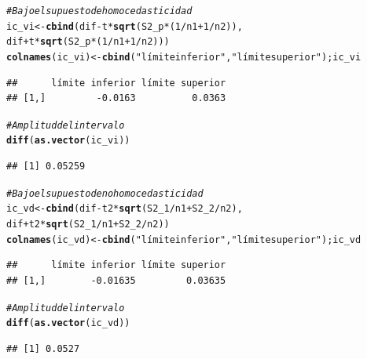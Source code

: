 \documentclass[a4paper]{scrartcl}\usepackage[]{graphicx}\usepackage[]{color}
\makeatletter
\newcommand{\hlnum}[1]{\textcolor[rgb]{0.686,0.059,0.569}{#1}}%
\newcommand{\hlstr}[1]{\textcolor[rgb]{0.192,0.494,0.8}{#1}}%
\newcommand{\hlcom}[1]{\textcolor[rgb]{0.678,0.584,0.686}{\textit{#1}}}%
\newcommand{\hlopt}[1]{\textcolor[rgb]{0,0,0}{#1}}%
\newcommand{\hlstd}[1]{\textcolor[rgb]{0.345,0.345,0.345}{#1}}%
\newcommand{\hlkwb}[1]{\textcolor[rgb]{0.69,0.353,0.396}{#1}}%
\newcommand{\hlkwd}[1]{\textcolor[rgb]{0.737,0.353,0.396}{\textbf{#1}}}%
\newenvironment{kframe}{%
 \def\at@end@of@kframe{}%
 \ifinner\ifhmode%
  \def\at@end@of@kframe{\end{minipage}}%
  \begin{minipage}{\columnwidth}%
 \fi\fi%
 \def\FrameCommand##1{\hskip\@totalleftmargin \hskip-\fboxsep
 \colorbox{shadecolor}{##1}\hskip-\fboxsep
     \hskip-\linewidth \hskip-\@totalleftmargin \hskip\columnwidth}%
 \MakeFramed {\advance\hsize-\width
   \@totalleftmargin\z@ \linewidth\hsize
   \@setminipage}}%
 {\par\unskip\endMakeFramed%
 \at@end@of@kframe}
\newenvironment{knitrout}{}{} %
\makeatother
\begin{document}
\begin{knitrout}
\color{fgcolor}\begin{kframe}
\begin{alltt}
\hlcom{# Bajo el supuesto de homocedasticidad}
\hlstd{ic_vi} \hlkwb{<-} \hlkwd{cbind}\hlstd{(dif} \hlopt{-} \hlstd{t} \hlopt{*} \hlkwd{sqrt}\hlstd{(S2_p}\hlopt{*}\hlstd{(}\hlnum{1}\hlopt{/}\hlstd{n1} \hlopt{+} \hlnum{1}\hlopt{/}\hlstd{n2)),}
               \hlstd{dif} \hlopt{+} \hlstd{t} \hlopt{*} \hlkwd{sqrt}\hlstd{(S2_p}\hlopt{*}\hlstd{(}\hlnum{1}\hlopt{/}\hlstd{n1} \hlopt{+} \hlnum{1}\hlopt{/}\hlstd{n2)))}
\hlkwd{colnames}\hlstd{(ic_vi)} \hlkwb{<-} \hlkwd{cbind}\hlstd{(}\hlstr{"límite inferior"}\hlstd{,}\hlstr{"límite superior"}\hlstd{);ic_vi}
\end{alltt}
\begin{verbatim}
##      límite inferior límite superior
## [1,]         -0.0163          0.0363
\end{verbatim}
\begin{alltt}
\hlcom{# Amplitud del intervalo}
\hlkwd{diff}\hlstd{(}\hlkwd{as.vector}\hlstd{(ic_vi))}
\end{alltt}
\begin{verbatim}
## [1] 0.05259
\end{verbatim}
\begin{alltt}
\hlcom{# Bajo el supuesto de no homocedasticidad}
\hlstd{ic_vd} \hlkwb{<-} \hlkwd{cbind}\hlstd{(dif} \hlopt{-} \hlstd{t2} \hlopt{*} \hlkwd{sqrt}\hlstd{(S2_1}\hlopt{/}\hlstd{n1} \hlopt{+} \hlstd{S2_2}\hlopt{/}\hlstd{n2),}
               \hlstd{dif} \hlopt{+} \hlstd{t2} \hlopt{*} \hlkwd{sqrt}\hlstd{(S2_1}\hlopt{/}\hlstd{n1} \hlopt{+} \hlstd{S2_2}\hlopt{/}\hlstd{n2))}
\hlkwd{colnames}\hlstd{(ic_vd)} \hlkwb{<-} \hlkwd{cbind}\hlstd{(}\hlstr{"límite inferior"}\hlstd{,}\hlstr{"límite superior"}\hlstd{);ic_vd}
\end{alltt}
\begin{verbatim}
##      límite inferior límite superior
## [1,]        -0.01635         0.03635
\end{verbatim}
\begin{alltt}
\hlcom{# Amplitud del intervalo}
\hlkwd{diff}\hlstd{(}\hlkwd{as.vector}\hlstd{(ic_vd))}
\end{alltt}
\begin{verbatim}
## [1] 0.0527
\end{verbatim}
\end{kframe}
\end{knitrout}
\end{document}
